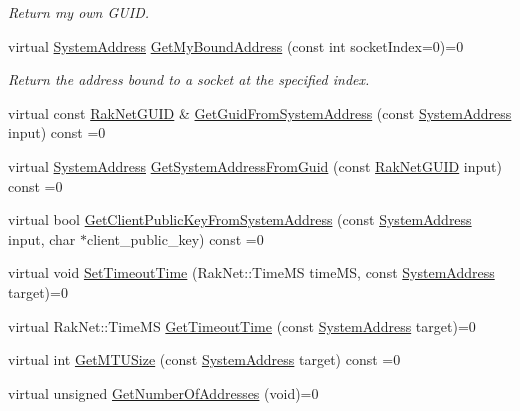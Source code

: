 \begin{DoxyCompactItemize}
\begin{DoxyCompactList}\small\item\em Return my own G\-U\-I\-D. \end{DoxyCompactList}\item 
\hypertarget{class_rak_net_1_1_rak_peer_interface_aa6abdf47bc3e2e016ccd0171a05e125b}{virtual \hyperlink{struct_rak_net_1_1_system_address}{System\-Address} \hyperlink{class_rak_net_1_1_rak_peer_interface_aa6abdf47bc3e2e016ccd0171a05e125b}{Get\-My\-Bound\-Address} (const int socket\-Index=0)=0}\label{class_rak_net_1_1_rak_peer_interface_aa6abdf47bc3e2e016ccd0171a05e125b}

\begin{DoxyCompactList}\small\item\em Return the address bound to a socket at the specified index. \end{DoxyCompactList}\item 
virtual const \hyperlink{struct_rak_net_1_1_rak_net_g_u_i_d}{Rak\-Net\-G\-U\-I\-D} \& \hyperlink{class_rak_net_1_1_rak_peer_interface_aac8203dda2ba1271e753bd113b259173}{Get\-Guid\-From\-System\-Address} (const \hyperlink{struct_rak_net_1_1_system_address}{System\-Address} input) const =0
\item 
virtual \hyperlink{struct_rak_net_1_1_system_address}{System\-Address} \hyperlink{class_rak_net_1_1_rak_peer_interface_adaaff66118400b6bbcb31c11419cd791}{Get\-System\-Address\-From\-Guid} (const \hyperlink{struct_rak_net_1_1_rak_net_g_u_i_d}{Rak\-Net\-G\-U\-I\-D} input) const =0
\item 
virtual bool \hyperlink{class_rak_net_1_1_rak_peer_interface_a7139f333758a31e5a1f44f06b120f085}{Get\-Client\-Public\-Key\-From\-System\-Address} (const \hyperlink{struct_rak_net_1_1_system_address}{System\-Address} input, char $\ast$client\-\_\-public\-\_\-key) const =0
\item 
virtual void \hyperlink{class_rak_net_1_1_rak_peer_interface_a49d2993d5db12a62ce88dc89700c0880}{Set\-Timeout\-Time} (Rak\-Net\-::\-Time\-M\-S time\-M\-S, const \hyperlink{struct_rak_net_1_1_system_address}{System\-Address} target)=0
\item 
virtual Rak\-Net\-::\-Time\-M\-S \hyperlink{class_rak_net_1_1_rak_peer_interface_a0fd3a4d282327944ee50b00c79baf420}{Get\-Timeout\-Time} (const \hyperlink{struct_rak_net_1_1_system_address}{System\-Address} target)=0
\item 
virtual int \hyperlink{class_rak_net_1_1_rak_peer_interface_af7359755639152292a3e35b6fb9877bb}{Get\-M\-T\-U\-Size} (const \hyperlink{struct_rak_net_1_1_system_address}{System\-Address} target) const =0
\item 
\hypertarget{class_rak_net_1_1_rak_peer_interface_a59b3cee62120132170dcf065b84114b2}{virtual unsigned \hyperlink{class_rak_net_1_1_rak_peer_interface_a59b3cee62120132170dcf065b84114b2}{Get\-Number\-Of\-Addresses} (void)=0}\label{class_rak_net_1_1_rak_peer_interface_a59b3cee62120132170dcf065b84114b2}


\end{DoxyCompactItemize}
